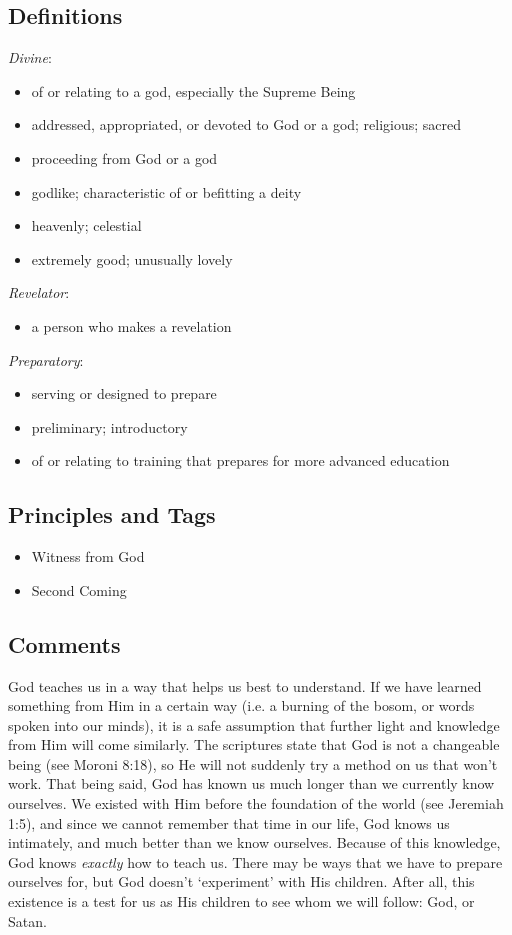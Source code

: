 \documentclass[12pt]{report}
\begin{document}
\subsection{Definitions\label{intro:DFN9}}
\emph{Divine}: \begin{itemize}
\item of or relating to a god, especially the Supreme Being
\item addressed, appropriated, or devoted to God or a god; religious; sacred
\item proceeding from God or a god
\item godlike; characteristic of or befitting a deity
\item heavenly; celestial
\item extremely good; unusually lovely
\end{itemize}
\emph{Revelator}: \begin{itemize}
\item a person who makes a revelation
\end{itemize}
\emph{Preparatory}: \begin{itemize}
\item serving or designed to prepare
\item preliminary; introductory
\item of or relating to training that prepares for more advanced education
\end{itemize}
\subsection{Principles and Tags\label{intro:principles9}}
\begin{itemize}
\item {}Witness from God
\item {}Second Coming
\end{itemize}

\subsection{Comments\label{intro:comment9}}
God teaches us in a way that helps us best to understand.  If we have learned something from Him in a certain way (i.e. a burning of the bosom, or words spoken into our minds), it is a safe assumption that further light and knowledge from Him will come similarly.  The scriptures state that God is not a changeable being (see Moroni 8:18), so He will not suddenly try a method on us that won't work.  That being said, God has known us much longer than we currently know ourselves.  We existed with Him before the foundation of the world (see Jeremiah 1:5), and since we cannot remember that time in our life, God knows us intimately, and much better than we know ourselves.  Because of this knowledge, God knows \emph{exactly} how to teach us.  There may be ways that we have to prepare ourselves for, but God doesn't `experiment' with His children.  After all, this existence is a test for us as His children to see whom we will follow: God, or Satan.
\end{document}
